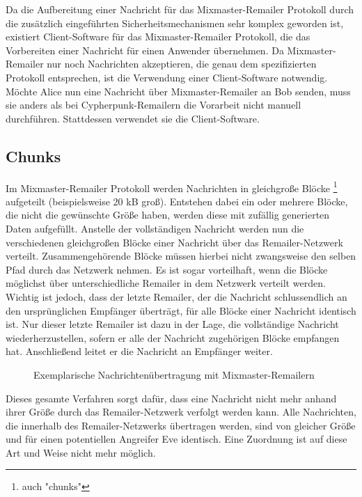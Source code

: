Da die Aufbereitung einer Nachricht für das Mixmaster-Remailer Protokoll durch die zusätzlich eingeführten Sicherheitsmechanismen sehr komplex geworden ist, existiert Client-Software für das Mixmaster-Remailer Protokoll, die das Vorbereiten einer Nachricht für einen Anwender übernehmen. Da Mixmaster-Remailer nur noch Nachrichten akzeptieren, die genau dem spezifizierten Protokoll entsprechen, ist die Verwendung einer Client-Software notwendig. Möchte Alice nun eine Nachricht über Mixmaster-Remailer an Bob senden, muss sie anders als bei Cypherpunk-Remailern die Vorarbeit nicht manuell durchführen. Stattdessen verwendet sie die Client-Software.

\subsection{Chunks}
Im Mixmaster-Remailer Protokoll werden Nachrichten in gleichgroße Blöcke \footnote{auch "chunks"} aufgeteilt (beispielsweise 20 kB groß). Entstehen dabei ein oder mehrere Blöcke, die nicht die gewünschte Größe haben, werden diese mit zufällig generierten Daten aufgefüllt. Anstelle der vollständigen Nachricht werden nun die verschiedenen gleichgroßen Blöcke einer Nachricht über das Remailer-Netzwerk verteilt. Zusammengehörende Blöcke müssen hierbei nicht zwangsweise den selben Pfad durch das Netzwerk nehmen. Es ist sogar vorteilhaft, wenn die Blöcke möglichst über unterschiedliche Remailer in dem Netzwerk verteilt werden. Wichtig ist jedoch, dass der letzte Remailer, der die Nachricht schlussendlich an den ursprünglichen Empfänger überträgt, für alle Blöcke einer Nachricht identisch ist. Nur dieser letzte Remailer ist dazu in der Lage, die vollständige Nachricht wiederherzustellen, sofern er alle der Nachricht zugehörigen Blöcke empfangen hat. Anschließend leitet er die Nachricht an Empfänger weiter.

\begin{figure}
	\begin{center}
		\def\svgwidth{0.9 \linewidth}
		
		\caption{Exemplarische Nachrichtenübertragung mit Mixmaster-Remailern}
	\end{center}
\end{figure}

Dieses gesamte Verfahren sorgt dafür, dass eine Nachricht nicht mehr anhand ihrer Größe durch das Remailer-Netzwerk verfolgt werden kann. Alle Nachrichten, die innerhalb des Remailer-Netzwerks übertragen werden, sind von gleicher Größe und für einen potentiellen Angreifer Eve identisch. Eine Zuordnung ist auf diese Art und Weise nicht mehr möglich.

